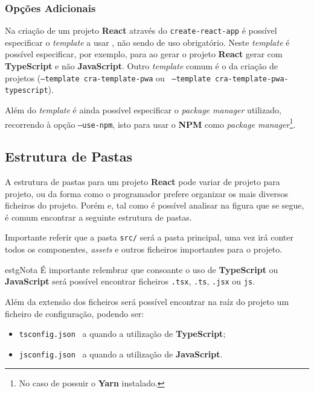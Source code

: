 \subsubsection{Opções Adicionais}

Na criação de um projeto \textbf{React} através do \texttt{create-react-app} é possível especificar o \textit{template} a usar , não sendo de uso obrigatório. Neste \textit{template} é possível especificar, por exemplo, para ao gerar o projeto \textbf{React} gerar com \textbf{TypeScript} e não \textbf{JavaScript}. Outro \textit{template} comum é o da criação de projetos  (\texttt{--template cra-template-pwa} ou ~\texttt{--template cra-template-pwa-typescript}).

Além do \textit{template} é ainda possível especificar o \textit{package manager} utilizado, recorrendo à opção \texttt{--use-npm}, isto para usar o \textbf{NPM} como \textit{package manager}\footnote{No caso de possuir o \textbf{Yarn} instalado.}.

\subsection{Estrutura de Pastas}

A estrutura de pastas para um projeto \textbf{React} pode variar de projeto para projeto, ou da forma como o programador prefere organizar os mais diversos ficheiros do projeto. Porém e, tal como é possível analisar na figura que se segue, é comum encontrar a seguinte estrutura de pastas.



Importante referir que a pasta \texttt{src/} será a pasta principal, uma vez irá conter todos os componentes, \textit{assets} e outros ficheiros importantes para o projeto.

\vspace{0.25cm}
\begin{mybox}{estg}{Nota}
	É importante relembrar que consoante o uso de \textbf{TypeScript} ou \textbf{JavaScript} será possível encontrar ficheiros \texttt{.tsx}, \texttt{.ts}, \texttt{.jsx} ou \texttt{js}.

	Além da extensão dos ficheiros será possível encontrar na raíz do projeto um ficheiro de configuração, podendo ser:
	\begin{itemize}
		\item \texttt{tsconfig.json} \textemdash~a quando a utilização de \textbf{TypeScript};
		\item \texttt{jsconfig.json} \textemdash~a quando a utilização de \textbf{JavaScript}.
	\end{itemize}
\end{mybox}

